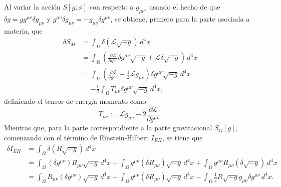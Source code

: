 Al variar la acci\'{o}n $S[g; \phi]$ con respecto a $g_{\mu \nu}$, usando el hecho de que $\delta g = g g^{\mu \nu} \delta g_{\mu \nu}$ y $g^{\mu \nu} \delta g_{\mu \nu} = -g_{\mu \nu} \delta g^{\mu \nu}$, se obtiene, primero para la parte asociada a materia, que
%
\begin{align}
\label{eq:varSML}
\delta S_{M} & = \int_{\Omega} \delta (\mathcal{L} \sqrt{-g}) \, d^{4} x \nonumber \\
& = \int_{\Omega} \left( \frac{\partial \mathcal{L}}{\partial g^{\mu \nu}} \delta g^{\mu \nu} \sqrt{-g} + \mathcal{L} \delta \sqrt{-g} \right) \, d^{4} x \nonumber \\
& = \int_{\Omega} \left( \frac{\partial \mathcal{L}}{\partial g^{\mu \nu}} - \frac{1}{2} \mathcal{L} g_{\mu \nu} \right) \delta g^{\mu \nu} \sqrt{-g} \, d^{4} x \nonumber \\
& = - \frac{1}{2} \int_{\Omega} T_{\mu \nu} \delta g^{\mu \nu} \sqrt{-g} \, d^{4} x,
\end{align}
%
definiendo el tensor de energ\'{i}a-momento como
%
\begin{equation}
\label{eq:TabL}
T_{\mu \nu} := \mathcal{L} g_{\mu \nu} - 2 \frac{\partial \mathcal{L}}{\partial g^{\mu \nu}}.
\end{equation}
%
%
%
Mientras que, para la parte correspondiente a la parte gravitacional $S_{G}[g]$, comenzando con el t\'{e}rmino de Einstein-Hilbert $I_{EH}$, se tiene que
%
\begin{align}
\label{eq:IEH}
\delta I_{EH} & = \int_{\Omega} \delta(R \sqrt{-g}) \, d^{4} x \nonumber \\
& = \int_{\Omega} (\delta g^{\mu \nu}) R_{\mu \nu} \sqrt{-g} \, d^{4} x + \int_{\Omega} g^{\mu \nu} (\delta R_{\mu \nu}) \sqrt{-g} \, d^{4} x + \int_{\Omega} g^{\mu \nu} R_{\mu \nu} (\delta \sqrt{-g}) \, d^{4} x \nonumber \\
& = \int_{\Omega} R_{\mu \nu} (\delta g^{\mu \nu}) \sqrt{-g} \, d^{4} x + \int_{\Omega} g^{\mu \nu} (\delta R_{\mu \nu}) \sqrt{-g} \, d^{4} x -  \int_{\Omega} \frac{1}{2} R \sqrt{-g} g_{\mu \nu} \delta g^{\mu \nu} \, d^{4} x.
\end{align}

